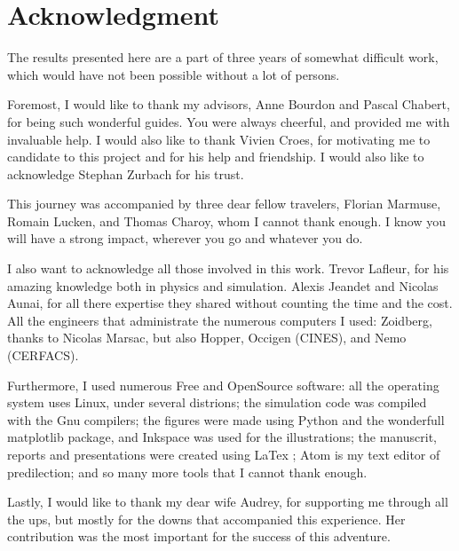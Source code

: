 



\chapter*{Acknowledgment}

The results presented here are a part of three years of somewhat difficult work, which would have not been possible without a lot of persons. 

Foremost, I would like to thank my advisors, Anne Bourdon and Pascal Chabert, for being such wonderful guides. 
You were always cheerful, and provided me with invaluable help.
I would also like to thank Vivien Croes, for motivating me to candidate to this project and for his help and friendship.
I would also like to acknowledge Stephan Zurbach for his trust.

This journey was accompanied by three dear fellow travelers, Florian Marmuse, Romain Lucken, and Thomas Charoy, whom I cannot thank enough.
I know you will have a strong impact, wherever you go and whatever you do.

I also want to acknowledge all those involved in this work.
Trevor Lafleur, for his amazing knowledge both in physics and simulation.
Alexis Jeandet and Nicolas Aunai, for all there expertise they shared without counting the time and the cost.
All the engineers that administrate the numerous computers I used: Zoidberg, thanks to Nicolas Marsac, but also Hopper, Occigen (CINES), and Nemo (CERFACS).

Furthermore, I used numerous Free and OpenSource software: all the operating system uses Linux, under several distrions; the simulation code was compiled with the Gnu compilers; the figures were made using Python and the wonderfull matplotlib package, and Inkspace was used for the illustrations; the manuscrit, reports and presentations were created using LaTex ; Atom is my text editor of predilection; and so many more tools that I cannot thank enough.

Lastly, I would like to thank my dear wife Audrey, for supporting me through all the ups, but mostly for the downs that accompanied this experience.
Her contribution was the most important for the success of this adventure.

